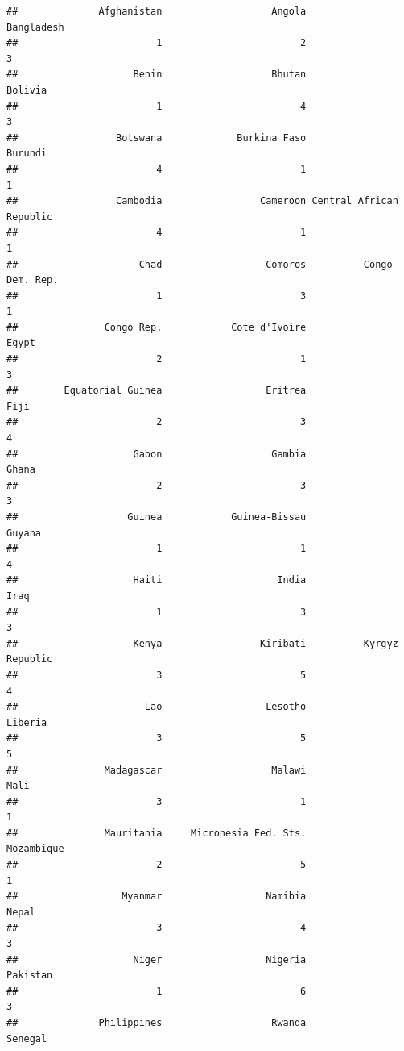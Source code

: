 \documentclass[
]{article}
\begin{document}
\begin{verbatim}
##              Afghanistan                   Angola               Bangladesh 
##                        1                        2                        3 
##                    Benin                   Bhutan                  Bolivia 
##                        1                        4                        3 
##                 Botswana             Burkina Faso                  Burundi 
##                        4                        1                        1 
##                 Cambodia                 Cameroon Central African Republic 
##                        4                        1                        1 
##                     Chad                  Comoros          Congo Dem. Rep. 
##                        1                        3                        1 
##               Congo Rep.            Cote d'Ivoire                    Egypt 
##                        2                        1                        3 
##        Equatorial Guinea                  Eritrea                     Fiji 
##                        2                        3                        4 
##                    Gabon                   Gambia                    Ghana 
##                        2                        3                        3 
##                   Guinea            Guinea-Bissau                   Guyana 
##                        1                        1                        4 
##                    Haiti                    India                     Iraq 
##                        1                        3                        3 
##                    Kenya                 Kiribati          Kyrgyz Republic 
##                        3                        5                        4 
##                      Lao                  Lesotho                  Liberia 
##                        3                        5                        5 
##               Madagascar                   Malawi                     Mali 
##                        3                        1                        1 
##               Mauritania     Micronesia Fed. Sts.               Mozambique 
##                        2                        5                        1 
##                  Myanmar                  Namibia                    Nepal 
##                        3                        4                        3 
##                    Niger                  Nigeria                 Pakistan 
##                        1                        6                        3 
##              Philippines                   Rwanda                  Senegal 

\end{verbatim}
\end{document}
